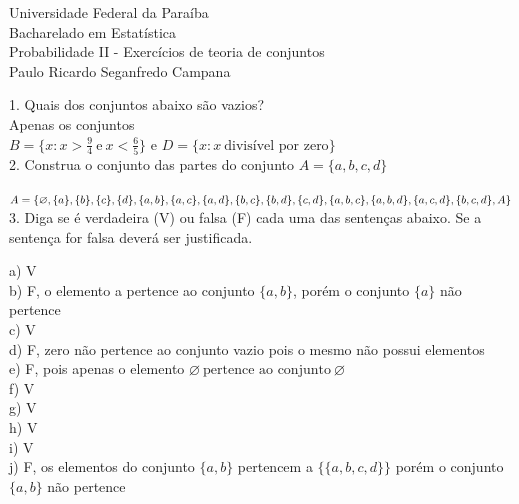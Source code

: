\documentclass[12pt]{article}
\begin{document}
	
	\pagestyle{empty}
	
	\begin{center}
		Universidade Federal da Paraíba\\
		Bacharelado em Estatística\\
		Probabilidade II - Exercícios de teoria de conjuntos\\
		Paulo Ricardo Seganfredo Campana\\
	\end{center}

	1. Quais dos conjuntos abaixo são vazios?\\

	\noindent Apenas os conjuntos\\
	\( B=\lbrace x:x>\frac{9}{4}\:\text{e}\:x<\frac{6}{5}\rbrace \) e \( D=\lbrace x:x \:\text{divisível por zero} \rbrace \)\\
	
	2. Construa o conjunto das partes do conjunto $A=\lbrace a, b, c, d\rbrace$
	\vspace{12pt}
  	
  	\noindent\( A = \lbrace \varnothing, \lbrace a \rbrace, \lbrace b \rbrace, \lbrace c \rbrace, \lbrace d \rbrace, \lbrace a, b \rbrace, \lbrace a, c \rbrace, \lbrace a, d \rbrace, \lbrace b, c \rbrace, \lbrace b, d \rbrace, \lbrace c, d \rbrace,\\ \lbrace a, b, c \rbrace, \lbrace a, b, d \rbrace, \lbrace a, c, d \rbrace, \lbrace b, c, d \rbrace, A \rbrace \)\\
  	
  	3. Diga se é verdadeira (V) ou falsa (F) cada uma das sentenças abaixo. Se a sentença for falsa deverá ser justificada.
  	\vspace{12pt}
  	
  	\noindent a) V\\
  	b) F, o elemento a pertence ao conjunto $\lbrace a, b\rbrace$, porém o conjunto $\lbrace a \rbrace$ não pertence\\
  	c) V\\
  	d) F, zero não pertence ao conjunto vazio pois o mesmo não possui elementos\\
  	e) F, pois apenas o elemento $ \varnothing\:\text{pertence ao conjunto}\:\varnothing $ \\
  	f) V\\
  	g) V\\
  	h) V\\
  	i) V\\
  	j) F, os elementos do conjunto $\lbrace a, b \rbrace$ pertencem a $\lbrace \lbrace a, b, c, d \rbrace \rbrace$ porém o conjunto $\lbrace a, b \rbrace$ não pertence\\
  	
\end{document}
